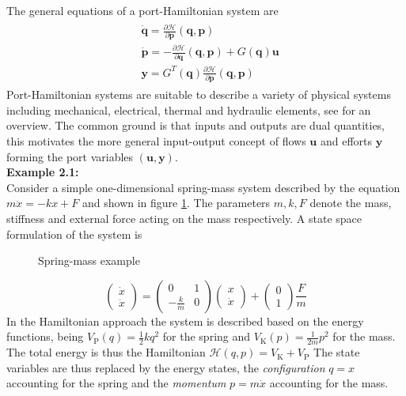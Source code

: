 \documentclass[a4paper,twoside, openright,12pt]{report}
\newcommand{\f}[1]{\boldsymbol{#1}}
\newcommand{\g}[1]{\text{#1}}
\begin{document}
The general equations of a port-Hamiltonian system are
\begin{eqnarray}
\begin{aligned}
	& \dot{\f{q}} = \frac{\partial \mathcal{H}}{\partial \f{p}}				(\f{q},\f{p})\\
	& \dot{\f{p}} = -\frac{\partial \mathcal{H}}{\partial \f{q}}				(\f{q},\f{p})+G(\f{q})\f{u} \\ 
	&\f{y} = G^T(\f{q})\frac{\partial \mathcal{H}}{\partial 				\f{p}}(\f{q},\f{p})
\end{aligned}	
\end{eqnarray}
Port-Hamiltonian systems are suitable to describe a variety of physical systems including mechanical, electrical, thermal and hydraulic elements, see \cite{duindam2009geoplexbook} for an overview. The common ground is that inputs and outputs are dual quantities, this motivates the more general input-output concept of flows $\f{u}$ and efforts $\f{y}$ forming the port variables $(\f{u},\f{y})$.\\
\textbf{Example 2.1:}\\
Consider a simple one-dimensional spring-mass system described by the equation $ m\ddot{x} = -kx +F $ and shown in figure \ref{FIG:springmass}. The parameters $ m,k,F $ denote the mass, stiffness and external force acting on the mass respectively. A state space formulation of the system is
\begin{figure}[b!]
	\centering
	\small
	\def\svgwidth{0.5\columnwidth}
	
	\caption[Spring-mass example]{Spring-mass example}
	\label{FIG:springmass}
\end{figure}
\begin{equation}
	\begin{pmatrix}\dot{x} \\ \ddot{x}\end{pmatrix} =
	\begin{pmatrix}0 & 1 \\ -\frac{k}{m} & 0\end{pmatrix}
	\begin{pmatrix}x \\ \dot{x}\end{pmatrix} + 
	\begin{pmatrix}0 \\ 1\end{pmatrix}\frac{F}{m}
\end{equation}
In the Hamiltonian approach the system is described based on the energy functions, being $ V_\g{P}(q) = \frac{1}{2}kq^2 $ for the spring and $ V_\g{K}(p) = \frac{1}{2m}p^2 $ for the mass. The total energy is thus the Hamiltonian $\mathcal{H}(q,p) = V_\g{K} + V_\g{P}$ The state variables are thus replaced by the energy states, the \emph{configuration} $q=x$ accounting for the spring and the \emph{momentum} $p=m\dot{x}$ accounting for the mass.  
\end{document}
